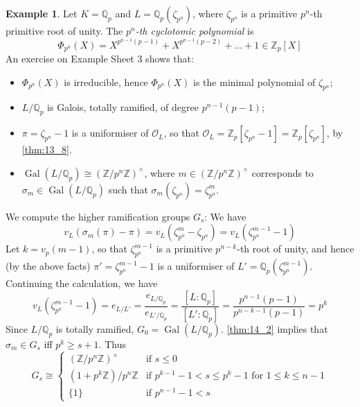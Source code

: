 \documentclass[11pt]{article}
\theoremstyle{definition}
\newtheorem*{example}{Example}
\theoremstyle{plain}
\theoremstyle{remark}
\DeclareMathOperator{\Gal}{Gal}
\newcommand{\ZZ}{\mathbb{Z}}
\newcommand{\QQ}{\mathbb{Q}}
\newcommand{\cO}{\mathcal{O}}
\begin{document}
\begin{example}
    Let $K = \QQ_p$ and $L = \QQ_p(\zeta_{p^n})$, where $\zeta_{p^n}$ is a primitive $p^n$-th primitive root of unity. The \emph{$p^n$-th cyclotomic polynomial} is
    \begin{equation*}
        \Phi_{p^n}(X) = X^{p^{n-1}(p-1)} + X^{p^{n-1}(p-2)} + \ldots + 1 \in \ZZ_p[X]
    \end{equation*}
    An exercise on Example Sheet 3 shows that:
    \begin{itemize}
        \item $\Phi_{p^n}(X)$ is irreducible, hence $\Phi_{p^n}(X)$ is the minimal polynomial of $\zeta_{p^n}$;
        \item $L/\QQ_p$ is Galois, totally ramified, of degree $p^{n-1}(p-1)$;
        \item $\pi = \zeta_{p^n} - 1$ is a uniformiser of $\cO_L$, so that $\cO_L = \ZZ_p[\zeta_{p^n} - 1] = \ZZ_p[\zeta_{p^n}]$, by \autoref{thm:13_8}.
        \item $\Gal(L/\QQ_p) \cong (\ZZ / p^n \ZZ)^\times$, where $m \in (\ZZ / p^n \ZZ)^\times$ corresponds to $\sigma_m \in \Gal(L/\QQ_p)$ such that $\sigma_m(\zeta_{p^n}) = \zeta_{p^n}^m$.
    \end{itemize}
    We compute the higher ramification groups $G_s$: We have
    \begin{equation*}
        v_L(\sigma_m(\pi) - \pi) = v_L(\zeta_{p^n}^m - \zeta_{p^n}) = v_L(\zeta_{p^n}^{m-1} - 1)
    \end{equation*}
    Let $k = v_p(m-1)$, so that $\zeta_{p^n}^{m-1}$ is a primitive $p^{n-k}$-th root of unity, and hence (by the above facts) $\pi' = \zeta_{p^n}^{m-1} - 1$ is a uniformiser of $L' = \QQ_p(\zeta_{p^n}^{m-1})$. Continuing the calculation, we have
    \begin{equation*}
        v_L(\zeta_{p^n}^{m-1} - 1) = e_{L/L'} = \frac{e_{L/\QQ_p}}{e_{L'/\QQ_p}} = \frac{[L : \QQ_p]}{[L' : \QQ_p]} = \frac{p^{n-1}(p-1)}{p^{n-k-1}(p-1)} = p^k
    \end{equation*}
    Since $L/\QQ_p$ is totally ramified, $G_0 = \Gal(L/\QQ_p)$. \autoref{thm:14_2} implies that $\sigma_m \in G_s$ iff $p^k \ge s+1$. Thus
    \begin{equation*}
        G_s \cong
        \begin{cases}
            (\ZZ / p^n \ZZ)^\times & \text{if } s \le 0\\
            (1 + p^k\ZZ) / p^n \ZZ & \text{if } p^{k-1} - 1 < s \le p^k - 1 \text{ for } 1 \le k \le n-1\\
            \{1\} & \text{if } p^{n-1} - 1 < s
        \end{cases}
    \end{equation*}
\end{example}
\end{document}
